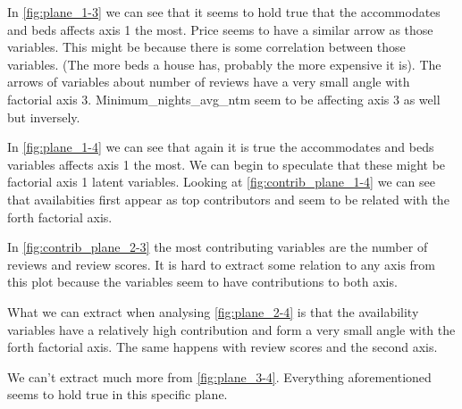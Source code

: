 

In \cref{fig:plane_1-3} we can see that it seems to hold true that the accommodates and beds affects axis 1 the most. Price 
seems to have a similar arrow as those variables. This might be
because there is some correlation between those variables. 
(The more beds a house has, probably the more expensive it is).
The arrows of variables about number of reviews have a very small angle with factorial axis 3. Minimum\_nights\_avg\_ntm seem to
be affecting axis 3 as well but inversely.



In \cref{fig:plane_1-4} we can see that again it is true
the accommodates and beds variables affects axis 1 the most. We can begin to speculate that these might be factorial axis 1
latent variables. Looking at \cref{fig:contrib_plane_1-4} we 
can see that availabities first appear as top contributors and seem to be related with the forth factorial axis.



In \cref{fig:contrib_plane_2-3} the most contributing variables are the number of reviews and review scores. It is hard to extract some relation to any axis
from this plot because the variables seem to have contributions to both axis.




What we can extract when analysing \cref{fig:plane_2-4} is that the availability variables have 
a relatively high contribution and form a very small angle with the forth factorial axis. The same happens with review scores and the second axis.



We can't extract much more from \cref{fig:plane_3-4}. Everything
aforementioned seems to hold true in this specific plane.


